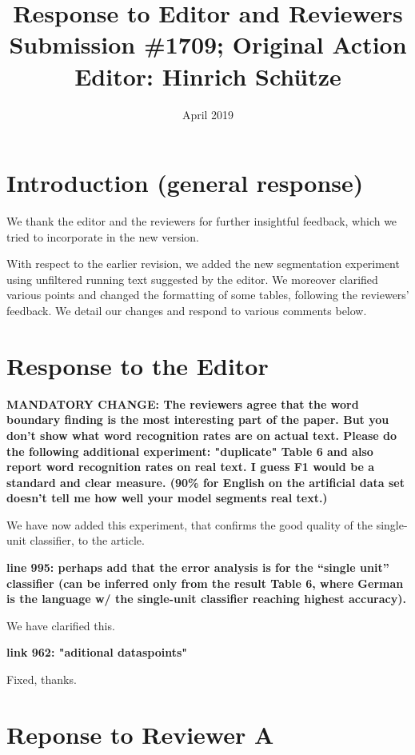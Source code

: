 \documentclass{article}[11pt,a4paper,oneside]
\title{Response to Editor and Reviewers \\ {\large Submission \#1709; Original Action Editor: Hinrich Sch{\"u}tze}}
\date{April 2019}
\begin{document}
\maketitle


\section{Introduction (general response)}

We thank the editor and the reviewers for further insightful feedback, which we tried to incorporate in the new version.

With respect to the earlier revision, we added the new segmentation experiment using unfiltered running text suggested by the editor. We moreover clarified various points and changed the formatting of some tables, following the reviewers' feedback. We detail our changes and respond to various comments below.

\section{Response to the Editor}

\textbf{
MANDATORY CHANGE: The reviewers agree that the word boundary
finding is the most interesting part of the paper. But you
don't show what word recognition rates are on actual
text.  Please do the following additional experiment:
"duplicate" Table 6 and also report word recognition rates
on real text. I guess F1 would be a standard and clear
measure. (90\% for English on the artificial data set doesn't
tell me how well your model segments real text.)}

We have now added this experiment, that confirms the good quality of the single-unit classifier, to the article.\newline

\textbf{
line 995: perhaps add that the error analysis is for the
``single unit'' classifier (can be inferred only from the
result Table 6, where German is the language w/ the
single-unit classifier reaching highest accuracy).}

We have clarified this.\newline

\textbf{
link 962: "aditional dataspoints"}

Fixed, thanks.

\section{Reponse to Reviewer A}
\end{document}
